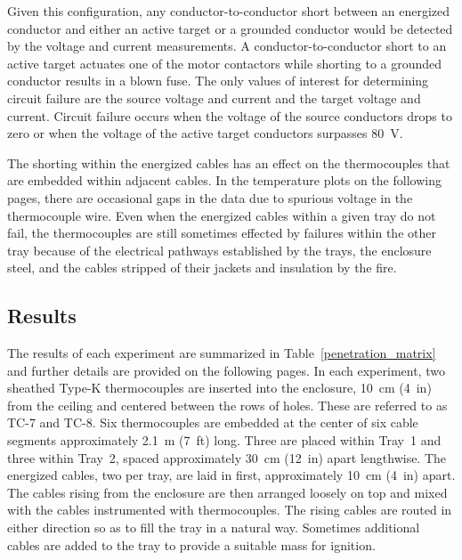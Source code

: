 Given this configuration, any conductor-to-conductor short between an energized conductor and either an active target or a grounded conductor would be detected by the voltage and current measurements. A conductor-to-conductor short to an active target actuates one of the motor contactors while shorting to a grounded conductor results in a blown fuse.  The only values of interest for determining circuit failure are the source voltage and current and the target voltage and current. Circuit failure occurs when the voltage of the source conductors drops to zero or when the voltage of the active target conductors surpasses 80~V.

The shorting within the energized cables has an effect on the thermocouples that are embedded within adjacent cables. In the temperature plots on the following pages, there are occasional gaps in the data due to spurious voltage in the thermocouple wire. Even when the energized cables within a given tray do not fail, the thermocouples are still sometimes effected by failures within the other tray because of the electrical pathways established by the trays, the enclosure steel, and the cables stripped of their jackets and insulation by the fire.


\clearpage


\subsection{Results}

The results of each experiment are summarized in Table~\ref{penetration_matrix} and further details are provided on the following pages. In each experiment, two sheathed Type-K thermocouples are inserted into the enclosure, 10~cm (4~in) from the ceiling and centered between the rows of holes. These are referred to as TC-7 and TC-8. Six thermocouples are embedded at the center of six cable segments approximately 2.1~m (7~ft) long. Three are placed within Tray~1 and three within Tray~2, spaced approximately 30~cm (12~in) apart lengthwise. The energized cables, two per tray, are laid in first, approximately 10~cm (4~in) apart. The cables rising from the enclosure are then arranged loosely on top and mixed with the cables instrumented with thermocouples. The rising cables are routed in either direction so as to fill the tray in a natural way. Sometimes additional cables are added to the tray to provide a suitable mass for ignition.


